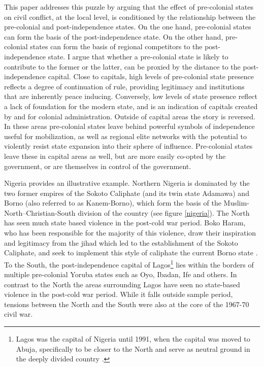 \documentclass[12pt]{article}
\begin{document}
This paper addresses this puzzle by arguing that the effect of pre-colonial
states on civil conflict, at the local level, is conditioned by the relationship
between the pre-colonial and post-independence states. On the one hand,
pre-colonial states can form the basis of the post-independence state. On the
other hand, pre-colonial states can form the basis of regional competitors to
the post-independence state. I argue that whether a pre-colonial state is likely
to contribute to the former or the latter, can be proxied by the distance to the
post-independence capital. Close to capitals, high levels of pre-colonial state
presence reflects a degree of continuation of rule, providing legitimacy and
institutions that are inherently peace inducing. Conversely, low levels of state
presence reflect a lack of foundation for the modern state, and is an indication
of capitals created by and for colonial administration. Outside of capital areas
the story is reversed. In these areas pre-colonial states leave behind powerful
symbols of independence useful for mobilization, as well as regional elite
networks with the potential to violently resist state expansion into their
sphere of influence. Pre-colonial states leave these in capital areas as well,
but are more easily co-opted by the government, or are themselves in control of
the government.

Nigeria provides an illustrative example. Northern Nigeria is dominated by the
two former empires of the Sokoto Caliphate (and its twin state Adamawa) and
Borno (also referred to as Kanem-Borno), which form the basis of the
Muslim-North--Christian-South division of the country (see figure
\ref{nigeria}). The North has seen much state based violence in the post-cold
war period. Boko Haram, who has been responsible for the majority of this
violence, draw their inspiration and legitimacy from the jihad which led to the
establishment of the Sokoto Caliphate, and seek to implement this style of
caliphate the current Borno state \citep{Pieri2016}. To the South, the
post-independence capital of Lagos\footnote{Lagos was the capital of Nigeria
until 1991, when the capital was moved to Abuja, specifically to be closer to
the North and serve as neutral ground in the deeply divided country
\citep{Moore_1984}.} lies within the borders of multiple pre-colonial Yoruba
states such as Oyo, Ibadan, Ife and others. In contrast to the North the areas
surrounding Lagos have seen no state-based violence in the post-cold war period.
While it falls outside sample period, tensions between the North and the South
were also at the core of the 1967-70 civil war.
\end{document}
